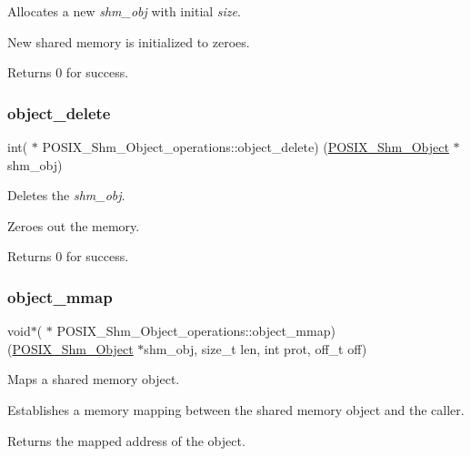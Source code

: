 Allocates a new {\itshape shm\+\_\+obj} with initial {\itshape size}. 

New shared memory is initialized to zeroes.

Returns 0 for success. \mbox{\label{structPOSIX__Shm__Object__operations_ae9c4b17f0861a7e2a7aa45e819e008c4}} 
\subsubsection{\texorpdfstring{object\_delete}{object\_delete}}
{\footnotesize\ttfamily int( $\ast$ P\+O\+S\+I\+X\+\_\+\+Shm\+\_\+\+Object\+\_\+operations\+::object\+\_\+delete) (\mbox{\hyperlink{structPOSIX__Shm__Object}{P\+O\+S\+I\+X\+\_\+\+Shm\+\_\+\+Object}} $\ast$shm\+\_\+obj)}



Deletes the {\itshape shm\+\_\+obj}. 

Zeroes out the memory.

Returns 0 for success. \mbox{\label{structPOSIX__Shm__Object__operations_afb54316e0b5da8b4de501949dfd98753}} 
\subsubsection{\texorpdfstring{object\_mmap}{object\_mmap}}
{\footnotesize\ttfamily void$\ast$( $\ast$ P\+O\+S\+I\+X\+\_\+\+Shm\+\_\+\+Object\+\_\+operations\+::object\+\_\+mmap) (\mbox{\hyperlink{structPOSIX__Shm__Object}{P\+O\+S\+I\+X\+\_\+\+Shm\+\_\+\+Object}} $\ast$shm\+\_\+obj, size\+\_\+t len, int prot, off\+\_\+t off)}



Maps a shared memory object. 

Establishes a memory mapping between the shared memory object and the caller.

Returns the mapped address of the object. \mbox{\label{structPOSIX__Shm__Object__operations_ae98afda0bb51a6b7502f24203248423b}} 
